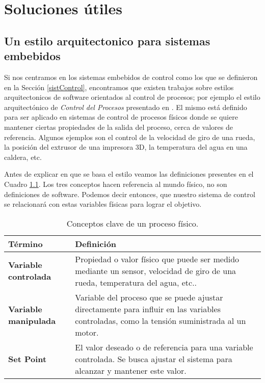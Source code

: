 \chapter{Soluciones útiles}

\section{Un estilo arquitectonico para sistemas embebidos}
\label{arqControlProc}

Si nos centramos en los sistemas embebidos de control como los que se definieron en la Sección \ref{sistControl}, encontramos que existen trabajos sobre estilos arquitectonicos de software orientados al control de procesos; por ejemplo el estilo arquitectónico de \textit{Control del Procesos} presentado en \cite{ShawGarlan1996}. El mismo está definido para ser aplicado en sistemas de control de procesos físicos donde se quiere mantener ciertas propiedades de la salida del proceso, cerca de valores de referencia. Algunos ejemplos son el control de la velocidad de giro de una rueda, la posición del extrusor de una impresora 3D, la temperatura del agua en una caldera, etc.

Antes de explicar en que se basa el estilo veamos las definiciones presentes en el Cuadro \ref{tab:conceptosArq}. Los tres conceptos hacen referencia al mundo físico, no son definiciones de software. Podemos decir entonces, que nuestro sistema de control se relacionará con estas variables físicas para lograr el objetivo.

\begin{table}[H]

\caption{Conceptos clave de un proceso físico.}
\label{tab:conceptosArq}
\setlength{\extrarowheight}{5pt} %
\renewcommand{\arraystretch}{1.0} %
\begin{tabular}{|>{\raggedright\arraybackslash}p{4.5cm}|>{\raggedright\arraybackslash}p{10.5cm}|}
\hline
\textbf{Término}               & \textbf{Definición}                                                                                                                                       \\ \hline
\textbf{Variable controlada}   & Propiedad o valor físico que puede ser medido mediante un sensor, velocidad de giro de una rueda, temperatura del agua, etc..    \\ \hline
\textbf{Variable manipulada}   & Variable del proceso que se puede ajustar directamente para influir en las variables controladas, como la tensión suministrada al un motor. \\ \hline
\textbf{Set Point}             & El valor deseado o de referencia para una variable controlada. Se busca ajustar el sistema para alcanzar y mantener este valor.                              \\ \hline

\end{tabular}
\end{table}

